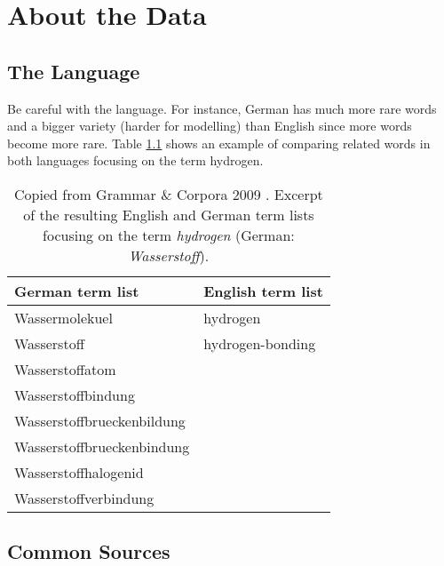 \chapter{About the Data}\label{ch:data}

\section{The Language}

Be careful with the language. For instance, German has much more rare words and a
bigger variety (harder for modelling) than English since more words become more 
rare. Table \ref{tab:ger-vs-eng-terms} shows an example of comparing related words 
in both languages focusing on the term hydrogen.

\begin{table}[!h]
\begin{center}
\begin{tabular}{ l | l }
\hline
\textbf{German term list} & \textbf{English term list} \\
\hline\hline
Wassermolekuel                & hydrogen                  \\ \hline
Wasserstoff                   & hydrogen-bonding          \\ \hline
Wasserstoffatom               &                           \\ \hline
Wasserstoffbindung            &                           \\ \hline
Wasserstoffbrueckenbildung    &                           \\ \hline
Wasserstoffbrueckenbindung    &                           \\ \hline
Wasserstoffhalogenid          &                           \\ \hline
Wasserstoffverbindung         &                           \\ \hline
\end{tabular}
\caption[Term list comparison between German and English]{
         Copied from Grammar \& Corpora 2009 \cite{konopka2011grammar}. Excerpt of 
         the resulting English and German term lists focusing on the term 
         \textit{hydrogen} (German: \textit{Wasserstoff}).}
\label{tab:ger-vs-eng-terms}
\end{center}
\end{table}



\section{Common Sources}\label{sec:common-sources}

